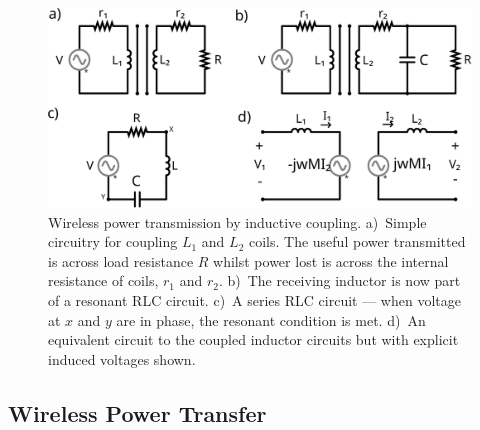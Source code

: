 \documentclass[11pt]{iopart}
\begin{document}
\begin{figure}
  \begin{center}
   \noindent\includegraphics[width=0.65\linewidth]{images/WPT.pdf}
  \end{center}
  \caption{Wireless power transmission by inductive
    coupling. a)~Simple circuitry for coupling $L_1$ and $L_2$
    coils. The useful power transmitted is across load resistance $R$
    whilst power lost is across the internal resistance of coils, $r_1$ and
    $r_2$. b)~The receiving inductor is now part of a resonant RLC
    circuit. c)~A series RLC circuit --- when voltage at $x$ and $y$
    are in phase, the resonant condition is met. d)~An equivalent
    circuit to the coupled inductor circuits but with explicit induced
    voltages shown. }\label{fig:WPT}
\end{figure}


\subsection{Wireless Power Transfer}
\end{document}
